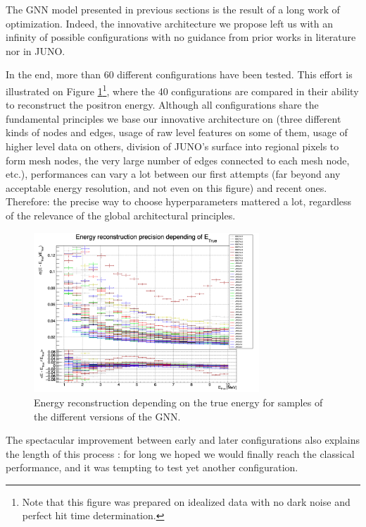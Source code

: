 \documentclass[../main.tex]{subfiles}
\begin{document}
The GNN model presented in previous sections is the result of a long work of optimization. Indeed, the innovative architecture we propose left us with an infinity of possible configurations with no guidance from prior works in literature nor in JUNO.

In the end, more than 60 different configurations have been tested. This effort is illustrated on Figure \ref{fig:jgnn:histor}\footnote{Note that this figure was prepared on idealized data with no dark noise and perfect hit time determination.},
where the 40 configurations are compared in their ability to reconstruct the positron energy. Although all configurations share the fundamental principles we base our innovative architecture on (three different kinds of nodes and edges, usage of raw level features on some of them, usage of higher level data on others, division of JUNO's surface into regional pixels to form mesh nodes, the very large number of edges connected to each mesh node, etc.), performances can vary a lot between our first attempts (far beyond any acceptable energy resolution, and not even on this figure) and recent ones. Therefore: the precise way to choose hyperparameters mattered a lot, regardless of the relevance of the global architectural principles.

\begin{figure}
  \centering
  \includegraphics[height=6cm]{images/jgnn/GNN_Optimization_hist.png}
  \caption{Energy reconstruction depending on the true energy for samples of the different versions of the GNN.}
  \label{fig:jgnn:histor}
\end{figure}

The spectacular improvement between early and later configurations also explains the length of this process : for long we hoped we would finally reach the classical performance, and it was tempting to test yet another configuration.

\end{document}
